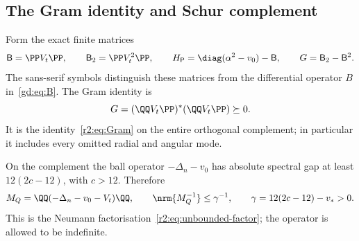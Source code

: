 \subsection{The Gram identity and Schur complement}\label{gd:sec:Schur}
Form the exact finite matrices
\begin{equation}\label{gd:eq:matrices}
 \mathsf B=\PP V_t\PP,\qquad \mathsf B_2=\PP V_t^2\PP,\qquad
 H_{\mathsf P}=\diag(\alpha^2-v_0)-\mathsf B,\qquad G=\mathsf B_2-\mathsf B^2.
\end{equation}
The sans-serif symbols distinguish these matrices from the differential
operator $B$ in~\eqref{gd:eq:B}. The Gram identity is
\begin{equation}\label{gd:eq:Gram}
 G=(\QQ V_t\PP)^*(\QQ V_t\PP)\succeq0.
\end{equation}
It is the identity~\eqref{r2:eq:Gram} on the entire orthogonal complement;
in particular it includes every omitted radial and angular mode.

On the complement the ball operator $-\Delta_n-v_0$ has absolute
spectral gap at least $12(2c-12)$, with $c>12$.
Therefore
\[
 M_Q=\QQ(-\Delta_n-v_0-V_t)\QQ,\qquad
 \nrm{M_Q^{-1}}\le\gamma^{-1},\qquad
 \gamma=12(2c-12)-v_*>0 .
\]
This is the Neumann factorisation~\eqref{r2:eq:unbounded-factor};
the operator is allowed to be indefinite.

